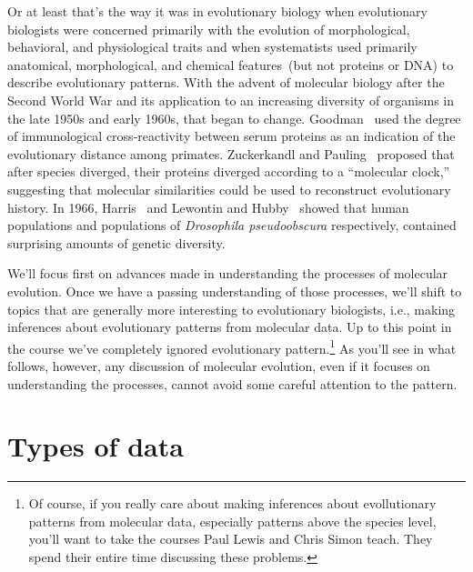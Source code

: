 Or at least that's the way it was in evolutionary biology when
evolutionary biologists were concerned primarily with the evolution of
morphological, behavioral, and physiological traits and when
systematists used primarily anatomical, morphological, and chemical
features~(but not proteins or DNA) to describe evolutionary
patterns. With the advent of molecular biology after the Second World
War and its application to an increasing diversity of organisms in the
late 1950s and early 1960s, that began to
change. Goodman~\cite{Goodman62} used the degree of immunological
cross-reactivity between serum proteins as an indication of the
evolutionary distance among primates. Zuckerkandl and
Pauling~\cite{Zuckerkandl-Pauling65} proposed that after species
diverged, their proteins diverged according to a ``molecular
clock,'' suggesting that molecular similarities
could be used to reconstruct evolutionary history. In 1966,
Harris~\cite{Harris66} and Lewontin and
Hubby~\cite{Hubby-Lewontin66,Lewontin-Hubby66} showed that human
populations and populations of {\it Drosophila pseudoobscura\/}
respectively, contained surprising amounts of genetic
diversity.

We'll focus first on advances made in understanding the processes of
molecular evolution. Once we have a passing understanding of those
processes, we'll shift to topics that are generally more interesting
to evolutionary biologists, i.e., making inferences about evolutionary
patterns from molecular data. Up to this point in the course we've
completely ignored evolutionary pattern.\footnote{Of course, if you
  really care about making inferences about evollutionary patterns
  from molecular data, especially patterns above the species level,
  you'll want to take the courses Paul Lewis and Chris Simon
  teach. They spend their entire time discussing these problems.}  As
you'll see in what follows, however, any discussion of molecular
evolution, even if it focuses on understanding the processes, cannot
avoid some careful attention to the pattern.

\section*{Types of data}

